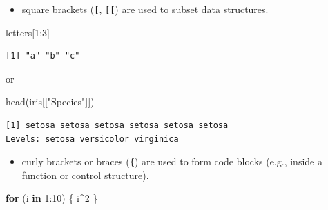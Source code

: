 \documentclass[ignorenonframetext,,t]{beamer}
\let\oldtextbf\textbf
\renewcommand{\textbf}[1]{\textcolor{spamwell}{\oldtextbf{#1}}}
\providecommand{\tightlist}{%
\setlength{\itemsep}{0pt}\setlength{\parskip}{0pt}}
\newenvironment{Shaded}{\begin{snugshade}}{\end{snugshade}}
\newcommand{\ControlFlowTok}[1]{\textcolor[rgb]{0.13,0.29,0.53}{\textbf{#1}}}
\newcommand{\DecValTok}[1]{\textcolor[rgb]{0.00,0.00,0.81}{#1}}
\newcommand{\FunctionTok}[1]{\textcolor[rgb]{0.00,0.00,0.00}{#1}}
\newcommand{\NormalTok}[1]{#1}
\newcommand{\SpecialCharTok}[1]{\textcolor[rgb]{0.00,0.00,0.00}{#1}}
\newcommand{\StringTok}[1]{\textcolor[rgb]{0.31,0.60,0.02}{#1}}
\providecommand{\tightlist}{%
\setlength{\itemsep}{0pt}\setlength{\parskip}{0pt}}
\renewcommand{\tightlist}{\setlength{\itemsep}{1.4ex}\setlength{\parskip}{0pt}}
\begin{document}
\begin{frame}[fragile]
\begin{itemize}
\tightlist
\item
  square brackets (\texttt{{[}}, \texttt{{[}{[}}) are used to subset
  data structures.
\end{itemize}

\begin{Shaded}
\begin{Highlighting}[]
\NormalTok{letters[}\DecValTok{1}\SpecialCharTok{:}\DecValTok{3}\NormalTok{]}
\end{Highlighting}
\end{Shaded}

\begin{verbatim}
[1] "a" "b" "c"
\end{verbatim}

or

\begin{Shaded}
\begin{Highlighting}[]
\FunctionTok{head}\NormalTok{(iris[[}\StringTok{"Species"}\NormalTok{]])}
\end{Highlighting}
\end{Shaded}

\begin{verbatim}
[1] setosa setosa setosa setosa setosa setosa
Levels: setosa versicolor virginica
\end{verbatim}
\end{frame}

\begin{frame}[fragile]
\begin{itemize}
\tightlist
\item
  curly brackets or braces (\texttt{\{}) are used to form code blocks
  (e.g., inside a function or control structure).
\end{itemize}

\begin{Shaded}
\begin{Highlighting}[]
\ControlFlowTok{for}\NormalTok{ (i }\ControlFlowTok{in} \DecValTok{1}\SpecialCharTok{:}\DecValTok{10}\NormalTok{) \{}
\NormalTok{  i}\SpecialCharTok{\^{}}\DecValTok{2}
\NormalTok{\} }
\end{Highlighting}
\end{Shaded}
\end{frame}
\end{document}
